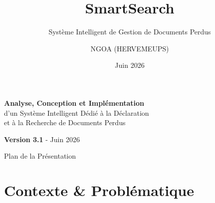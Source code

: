 \documentclass[aspectratio=169]{beamer}
\title[SmartSearch]{SmartSearch}
\subtitle{Système Intelligent de Gestion de Documents Perdus}
\author{NGOA (HERVEMEUPS)}
\institute{M2 SIGL Professionnel}
\date{Juin 2026}
\begin{document}
\begin{frame}
    \titlepage
    \begin{center}
        \Large
        \textbf{Analyse, Conception et Implémentation} \\
        \large
        d'un Système Intelligent Dédié à la Déclaration \\
        et à la Recherche de Documents Perdus

        \vspace{0.5cm}
        \normalsize
        \textbf{Version 3.1} - Juin 2026
    \end{center}
\end{frame}

\begin{frame}{Plan de la Présentation}
    \tableofcontents
\end{frame}

\section{Contexte \& Problématique}
\end{document}
